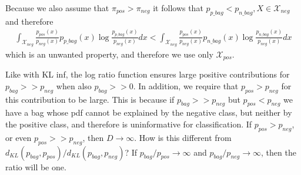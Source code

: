 %


Because we also assume that $\pi_{pos} > \pi_{neg}$ it follows that $p_{p \_ bag} < p_{n \_ bag}, X \in \mathcal{X}_{neg}$ and therefore 
\begin{align}
  \int_{\mathcal{X}_{neg}} \frac{p_{pos}(x)}{p_{neg}(x)} p_{p\_bag}(x) \log \frac{p_{p\_bag}(x)}{p_{neg}(x)} dx < \int_{\mathcal{X}_{neg}} \frac{p_{pos}(x)}{p_{neg}(x)} p_{n \_ bag}(x) \log \frac{p_{n \_bag}(x)}{p_{neg}(x)} dx
\end{align}
which is an unwanted property, and therefore we use only $\mathcal{X}_{pos}$.

Like with KL inf, the log ratio function ensures large positive contributions for $p_{bag} >> p_{neg}$ when also $p_{bag} >> 0$. 
In addition, we require that $p_{pos} > p_{neg}$ for this contribution to be large. 
This is because if $p_{bag} >> p_{neg}$ but $p_{pos} < p_{neg}$ we have a bag whose pdf cannot be explained by the negative class, but neither by the positive class, and therefore is uninformative for classification. 
If $p_{pos} > p_{neg}$, or even $p_{pos} >> p_{neg}$, then $D \rightarrow \infty$.
How is this different from $d_{KL}(p_{bag},p_{pos})/d_{KL}(p_{bag},p_{neg})$?
If $p_{bag}/p_{pos} \rightarrow \infty$ and $p_{bag}/p_{neg} \rightarrow \infty$, then the ratio will be one. 


